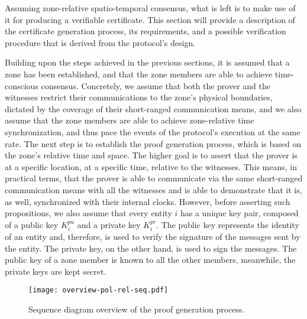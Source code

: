 Assuming zone-relative spatio-temporal consensus, what is left is to make use of it for producing a verifiable \pol{} certificate. This section will provide a description of the certificate generation process, its requirements, and a possible verification procedure that is derived from the \pol{} protocol's design. 


Building upon the steps achieved in the previous sections, it is assumed that a zone has been established, and that the zone members are able to achieve time-conscious consensus. Concretely, we assume that both the prover and the witnesses restrict their communications to the zone's physical boundaries, dictated by the coverage of their short-ranged communication means, and we also assume that the zone members are able to achieve zone-relative time synchronization, and thus pace the events of the protocol's execution at the same rate. The next step is to establish the proof generation process, which is based on the zone's relative time and space. The higher goal is to assert that the prover is at a specific location, at a specific time, relative to the witnesses. This means, in practical terms, that the prover is able to communicate via the same short-ranged communication means with all the witnesses and is able to demonstrate that it is, as well, synchronized with their internal clocks. However, before asserting such propositions, we also assume that every entity $i$ has a unique key pair, composed of a public key $K^{pu}_i$ and a private key $K^{pr}_i$. The public key represents the identity of an entity and, therefore, is used to verify the signature of the messages sent by the entity. The private key, on the other hand, is used to sign the messages. The public key of a zone member is known to all the other members, meanwhile, the private keys are kept secret. 

\begin{figure}[hb!]
    \begin{center}
    \texttt{[image: overview-pol-rel-seq.pdf]}
    \caption{Sequence diagram overview of the proof generation process.}
    \label{fig:proof-of-location-overview-relative-pol-seq}
    \end{center}
\end{figure}


